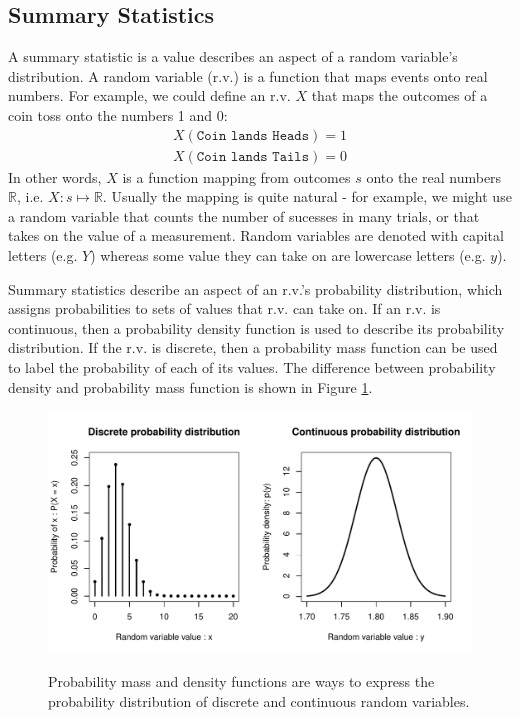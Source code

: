 \documentclass[11pt,a4paper,article]{memoir} %
\begin{document}
\subsection*{Summary Statistics}
 A summary statistic is a value describes an aspect of a random variable's distribution. A random variable (r.v.) is a function that maps events onto real numbers. For example, we could define an r.v. $X$ that maps the outcomes of a coin toss onto the numbers 1 and 0:
 \begin{align}
	X(\texttt{Coin lands Heads}) = 1 \\
	X(\texttt{Coin lands Tails}) =0
 \end{align}
In other words, $X$ is a function mapping from outcomes $s$ onto the real numbers $\mathbb{R}$, i.e. $X: s \mapsto \mathbb{R}$. Usually the mapping is quite natural - for example, we might use a random variable that counts the number of sucesses in many trials, or that takes on the value of a measurement. Random variables are denoted with capital letters (e.g. $Y$) whereas some value they can take on are lowercase letters (e.g. $y$).
\par
Summary statistics describe an aspect of an r.v.'s probability distribution, which assigns probabilities to sets of values that r.v. can take on. If an r.v. is continuous, then a probability density function is used to describe its probability distribution. If the r.v. is discrete, then a probability mass function can be used to label the probability of each of its values. The difference between probability density and probability mass function is shown in Figure \ref{fig:example_pd}.
\begin{figure}
\includegraphics[width=\textwidth]{probability_distributions.pdf}
\label{fig:example_pd}
\caption{Probability mass and density functions are ways to express the probability distribution of discrete and continuous random variables.}
\end{figure}
\end{document}
